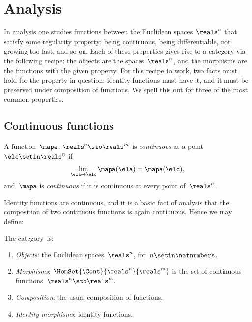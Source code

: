 
\section[Analysis]{Analysis}
\label{sec:cats-of-analysis}

In analysis one studies functions between the Euclidean spaces~$\reals^n$ that satisfy some regularity property: being continuous, being differentiable, not growing too fast, and so on.
Each of these properties gives rise to a category via the following recipe: the objects are the spaces~$\reals^n$, and the morphisms are the functions with the given property.
For this recipe to work, two facts must hold for the property in question: identity functions must have it, and it must be preserved under composition of functions.
We spell this out for three of the most common properties.

\subsection{Continuous functions}

\begin{definition}
    \label{def:continuous-function}
    A function~$\mapa \colon \reals^n \sto \reals^m$ is \emph{continuous} at a point~$\elc \setin \reals^n$ if
    \begin{equation}
        \lim_{\ela \to \elc} \mapa(\ela) = \mapa(\elc),
    \end{equation}
    and~$\mapa$ is \emph{continuous} if it is continuous at every point of~$\reals^n$.
\end{definition}

Identity functions are continuous, and it is a basic fact of analysis that the composition of two continuous functions is again continuous.
Hence we may define:

\begin{ctdefinition}
    \label{def:cat-Cont}
    The category~\Cont is:
    \begin{enumerate}
        \item \emph{Objects}: the Euclidean spaces~$\reals^n$, for~$n \setin \natnumbers$.
        \item \emph{Morphisms}: $\HomSet{\Cont}{\reals^n}{\reals^m}$ is the set of continuous functions~$\reals^n \sto \reals^m$.
        \item \emph{Composition}: the usual composition of functions.
        \item \emph{Identity morphisms}: identity functions.
    \end{enumerate}
\end{ctdefinition}

